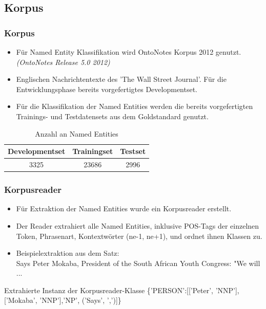\documentclass{beamer}
\begin{document}
	\subsection{Korpus}
	\begin{frame}
			\frametitle{Korpus}
			\begin{itemize}
				\item Für Named Entity Klassifikation wird OntoNotes Korpus 2012 genutzt. \textit{(OntoNotes Release 5.0 2012)}
				\item Englischen Nachrichtentexte des 'The Wall Street Journal'.
				Für die Entwicklungsphase bereits vorgefertigtes Developmentset.
				\item Für die Klassifikation der Named Entities werden die bereits vorgefertigten Trainings- und Testdatensets aus dem Goldstandard genutzt.
			\end{itemize}
			 \begin{table}
			 	\caption{Anzahl an  Named Entities}
			 	\begin{tabular}{ccc}
			 		\toprule
					Developmentset & Trainingset & Testset\\
			 		\midrule
					3325 & 23686 & 2996\\
			 		\bottomrule
			 	\end{tabular}
			 	\label{tab:datasets}
			 \end{table}
	\end{frame}
		\begin{frame}
			\frametitle{Korpusreader}
			\begin{itemize}
				\item Für Extraktion der Named Entities wurde ein Korpusreader erstellt.
				\item 	Der Reader extrahiert alle Named Entities, inklusive POS-Tags der einzelnen Token, Phrasenart, Kontextwörter (ne-1, ne+1), und ordnet ihnen Klassen zu.
				\item Beispielextraktion aus dem Satz:\\
				Says Peter Mokaba, President of the South African Youth Congress: "We will ...
			\end{itemize}
			
			
		
			
			\begin{exampleblock}{Extrahierte Instanz der Korpusreader-Klasse}
				\{'PERSON':[['Peter', 'NNP'],['Mokaba', 'NNP'],'NP', ('Says', ',')]\}
			\end{exampleblock}
			
		\end{frame}
	
\end{document}
